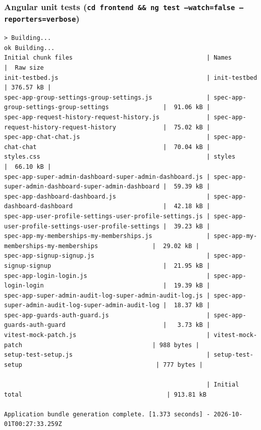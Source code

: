 \documentclass[10pt,a4paper]{article}
\newcommand{\ep}[1]{\texttt{\small #1}}
\begin{document}
\subsubsection*{Angular unit tests (\ep{cd frontend \&\& ng test --watch=false --reporters=verbose})}
\begin{Verbatim}[fontsize=\scriptsize,breaklines,frame=single]
> Building...
ok Building...
Initial chunk files                                     | Names                                                |  Raw size
init-testbed.js                                         | init-testbed                                         | 376.57 kB |
spec-app-group-settings-group-settings.js               | spec-app-group-settings-group-settings               |  91.06 kB |
spec-app-request-history-request-history.js             | spec-app-request-history-request-history             |  75.02 kB |
spec-app-chat-chat.js                                   | spec-app-chat-chat                                   |  70.04 kB |
styles.css                                              | styles                                               |  66.10 kB |
spec-app-super-admin-dashboard-super-admin-dashboard.js | spec-app-super-admin-dashboard-super-admin-dashboard |  59.39 kB |
spec-app-dashboard-dashboard.js                         | spec-app-dashboard-dashboard                         |  42.18 kB |
spec-app-user-profile-settings-user-profile-settings.js | spec-app-user-profile-settings-user-profile-settings |  39.23 kB |
spec-app-my-memberships-my-memberships.js               | spec-app-my-memberships-my-memberships               |  29.02 kB |
spec-app-signup-signup.js                               | spec-app-signup-signup                               |  21.95 kB |
spec-app-login-login.js                                 | spec-app-login-login                                 |  19.39 kB |
spec-app-super-admin-audit-log-super-admin-audit-log.js | spec-app-super-admin-audit-log-super-admin-audit-log |  18.37 kB |
spec-app-guards-auth-guard.js                           | spec-app-guards-auth-guard                           |   3.73 kB |
vitest-mock-patch.js                                    | vitest-mock-patch                                    | 988 bytes |
setup-test-setup.js                                     | setup-test-setup                                     | 777 bytes |

                                                        | Initial total                                        | 913.81 kB

Application bundle generation complete. [1.373 seconds] - 2026-10-01T00:27:33.259Z


\end{Verbatim}
\end{document}
